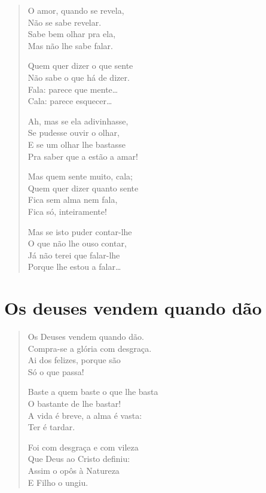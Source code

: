 \documentclass[10pt,a5paper,oneside]{book}
\begin{document}
\begin{verse}
O amor, quando se revela,\\
Não se sabe revelar.\\
Sabe bem olhar pra ela,\\
Mas não lhe sabe falar.

Quem quer dizer o que sente\\
Não sabe o que há de dizer.\\
Fala: parece que mente\ldots{}\\
Cala: parece esquecer\ldots{}

Ah, mas se ela adivinhasse,\\
Se pudesse ouvir o olhar,\\
E se um olhar lhe bastasse\\
Pra saber que a estão a amar!

Mas quem sente muito, cala;\\
Quem quer dizer quanto sente\\
Fica sem alma nem fala,\\
Fica só, inteiramente!

Mas se isto puder contar-lhe\\
O que não lhe ouso contar,\\
Já não terei que falar-lhe\\
Porque lhe estou a falar\ldots{}
\end{verse}

\chapter{Os deuses vendem quando dão}

\begin{verse}
Os Deuses vendem quando dão.\\
Compra-se a glória com desgraça.\\
Ai dos felizes, porque são\\
Só o que passa!

Baste a quem baste o que lhe basta\\
O bastante de lhe bastar!\\
A vida é breve, a alma é vasta:\\
Ter é tardar.

Foi com desgraça e com vileza\\
Que Deus ao Cristo definiu:\\
Assim o opôs à Natureza\\
E Filho o ungiu.
\end{verse}
\end{document}
